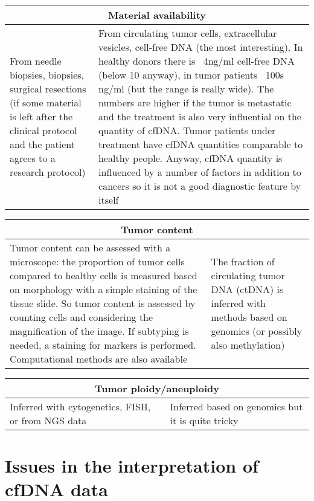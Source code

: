 \begin{tabular}{ | m{7cm}| m{7cm} | }
 \hline
 \multicolumn{2}{|c|}{Material availability} \\
 \hline
 From needle biopsies, biopsies, surgical resections (if some material is left after the clinical protocol and the patient agrees to a research protocol) & From circulating tumor cells, extracellular vesicles, cell-free DNA (the most interesting). In healthy donors there is ~4ng/ml cell-free DNA (below 10 anyway), in tumor patients ~100s ng/ml (but the range is really wide). The numbers are higher if the tumor is metastatic and the treatment is also very influential on the quantity of cfDNA. Tumor patients under treatment have cfDNA quantities comparable to healthy people. Anyway, cfDNA quantity is influenced by a number of factors in addition to cancers so it is not a good diagnostic feature by itself \\
 \hline
\end{tabular}

\begin{tabular}{ | m{7cm}| m{7cm} | }
 \hline
 \multicolumn{2}{|c|}{Tumor content} \\
 \hline
 Tumor content can be assessed with a microscope: the proportion of tumor cells compared to healthy cells is measured based on morphology with a simple staining of the tissue slide. So tumor content is assessed by counting cells and considering the magnification of the image. If subtyping is needed, a staining for markers is performed. Computational methods are also available & The fraction of circulating tumor DNA (ctDNA) is inferred with methods based on genomics (or possibly also methylation) \\
 \hline
\end{tabular}

\begin{tabular}{ | m{7cm}| m{7cm} | }
 \hline
 \multicolumn{2}{|c|}{Tumor ploidy/aneuploidy } \\
 \hline
 Inferred with cytogenetics, FISH, or from NGS data & Inferred based on genomics but it is quite tricky \\
 \hline

\end{tabular}

\section{Issues in the interpretation of cfDNA data}

